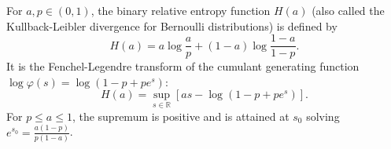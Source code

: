 For $a, p \in (0,1)$, the binary relative entropy function $H(a)$ (also called the Kullback-Leibler divergence for Bernoulli distributions) is defined by
$$
H(a) = a \log\frac{a}{p} + (1 - a) \log\frac{1 - a}{1 - p}.
$$
It is the Fenchel-Legendre transform of the cumulant generating function $\log \varphi(s) = \log(1 - p + p e^s)$:
$$
H(a) = \sup_{s \in \mathbb{R}} [as - \log(1 - p + p e^s)].
$$
For $p \leq a \leq 1$, the supremum is positive and is attained at $s_0$ solving $e^{s_0} = \frac{a(1-p)}{p(1-a)}$.
